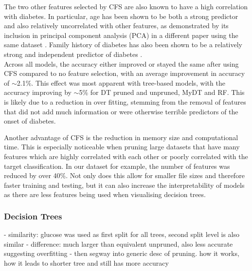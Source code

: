 The two other features selected by CFS are also known to have a high correlation with diabetes. In particular, age has been shown to be both a strong predictor \cite{i} and also relatively uncorrelated with other features, as demonstrated by its inclusion in principal component analysis (PCA) in a different paper using the same dataset \cite{c}. Family history of diabetes has also been shown to be a relatively strong and independent predictor of diabetes \cite{j}. \\


Across all models, the accuracy either improved or stayed the same after using CFS compared to no feature selection, with an average improvement in accuracy of $\sim$2.1\%. This effect was most apparent with tree-based models, with the accuracy improving by $\sim$5\% for DT pruned and unpruned, MyDT and RF. This is likely due to a reduction in over fitting, stemming from the removal of features that did not add much information or were otherwise terrible predictors of the onset of diabetes.

Another advantage of CFS is the reduction in memory size and computational time. This is especially noticeable when pruning large datasets that have many features which are highly correlated with each other  or poorly correlated with the target classification. In our dataset for example, the number of features was reduced by over 40\%. Not only does this allow for smaller file sizes and therefore faster training and testing, but it can also increase the interpretability of models as there are less features being used when visualising decision trees.

\subsubsection{Decision Trees}





- similarity: glucose was used as first split for all trees, second split level is also similar
- difference: much larger than equivalent unpruned, also less accurate suggesting overfitting
- then segway into generic desc of pruning. how it works, how it leads to shorter tree and still has more accuracy



